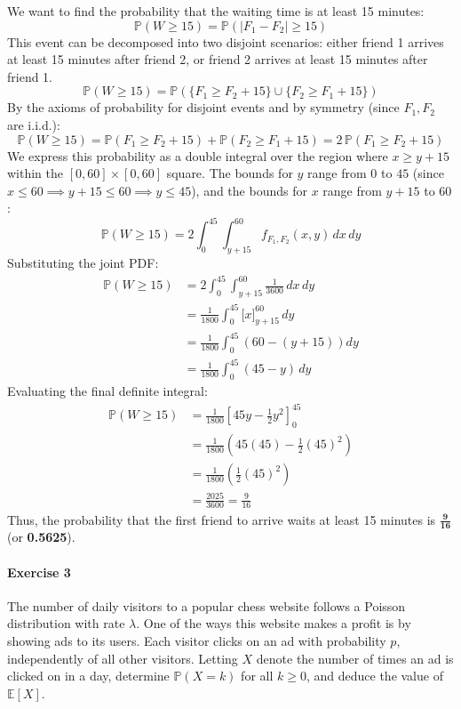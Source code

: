\documentclass[a4paper,12pt]{article}
\newcommand{\mb}[1]{\mathbb{#1}}
\begin{document}
We want to find the probability that the waiting time is at least 15 minutes:
\[
\mathbb{P}(W \ge 15) = \mathbb{P}(|F_1 - F_2| \ge 15)
\]
This event can be decomposed into two disjoint scenarios: either friend 1 arrives at least 15 minutes after friend 2, or friend 2 arrives at least 15 minutes after friend 1.
\[
\mathbb{P}(W \ge 15) = \mathbb{P}(\{F_1 \ge F_2 + 15\} \cup \{F_2 \ge F_1 + 15\})
\]
By the axioms of probability for disjoint events and by symmetry (since $F_1, F_2$ are i.i.d.):
\[
\mathbb{P}(W \ge 15) = \mathbb{P}(F_1 \ge F_2 + 15) + \mathbb{P}(F_2 \ge F_1 + 15) = 2 \, \mathbb{P}(F_1 \ge F_2 + 15)
\]
We express this probability as a double integral over the region where $x \ge y + 15$ within the $[0, 60] \times [0, 60]$ square. The bounds for $y$ range from $0$ to $45$ (since $x \le 60 \implies y + 15 \le 60 \implies y \le 45$), and the bounds for $x$ range from $y + 15$ to $60$:
\[
\mathbb{P}(W \ge 15) = 2 \int_{0}^{45} \int_{y+15}^{60} f_{F_1, F_2}(x, y) \, dx \, dy
\]
Substituting the joint PDF:
\begin{align*}
\mathbb{P}(W \ge 15) &= 2 \int_{0}^{45} \int_{y+15}^{60} \frac{1}{3600} \, dx \, dy \\
&= \frac{1}{1800} \int_{0}^{45} \Big[ x \Big]_{y+15}^{60} \, dy \\
&= \frac{1}{1800} \int_{0}^{45} \left( 60 - (y + 15) \right) dy \\
&= \frac{1}{1800} \int_{0}^{45} (45 - y) \, dy
\end{align*}
Evaluating the final definite integral:
\begin{align*}
\mathbb{P}(W \ge 15) &= \frac{1}{1800} \left[ 45y - \frac{1}{2}y^2 \right]_{0}^{45} \\
&= \frac{1}{1800} \left( 45(45) - \frac{1}{2}(45)^2 \right) \\
&= \frac{1}{1800} \left( \frac{1}{2}(45)^2 \right) \\
&= \frac{2025}{3600} = \frac{9}{16}
\end{align*}
Thus, the probability that the first friend to arrive waits at least 15 minutes is $\mathbf{\frac{9}{16}}$ (or \textbf{0.5625}).

\paragraph{Exercise 3}  The number of daily visitors to a popular chess website follows a Poisson distribution with rate $\lambda$. One of the ways this website makes a profit is by showing ads to its users. Each visitor clicks on an ad with probability $p$, independently of all other visitors. Letting $X$ denote the number of times an ad is clicked on in a day, determine $\mb{P}(X = k)$ for all $k \ge 0$, and deduce the value of $\mb{E}[X]$.
\end{document}
